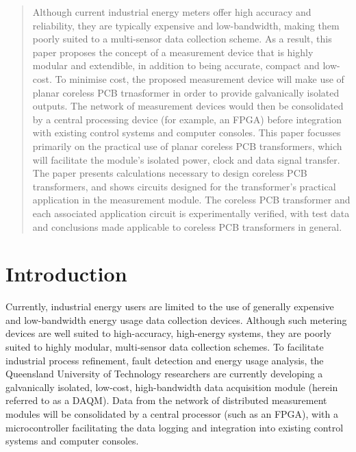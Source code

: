 \documentclass[conference]{IEEEtran}
\begin{document}
\begin{abstract}
Although current industrial energy meters offer high accuracy and reliability, they are typically expensive and low-bandwidth, making them poorly suited to a multi-sensor data collection scheme.  As a result, this paper proposes the concept of a measurement device that is highly modular and extendible, in addition to being accurate, compact and low-cost.  To minimise cost, the proposed measurement device will make use of planar coreless PCB trnasformer in order to provide galvanically isolated outputs.  The network of measurement devices would then be consolidated by a central processing device (for example, an FPGA) before integration with existing control systems and computer consoles.  
This paper focusses primarily on the practical use of planar coreless PCB transformers, which will facilitate the module's isolated power, clock and data signal transfer.  The paper presents calculations necessary to design coreless PCB transformers, and shows circuits designed for the transformer's practical application in the measurement module.  The coreless PCB transformer and each associated application circuit is experimentally verified, with test data and conclusions made applicable to coreless PCB transformers in general.
\end{abstract}


\IEEEpeerreviewmaketitle

\section{Introduction}
Currently, industrial energy users are limited to the use of generally expensive and low-bandwidth energy usage data collection devices. Although such metering devices are well suited to high-accuracy, high-energy systems, they are poorly suited to highly modular, multi-sensor data collection schemes.  To facilitate industrial process refinement, fault detection and energy usage analysis, the Queensland University of Technology researchers are currently developing a galvanically isolated, low-cost, high-bandwidth data acquisition module (herein referred to as a DAQM).  Data from the network of distributed measurement modules will be consolidated by a central processor (such as an FPGA), with a microcontroller facilitating the data logging and integration into existing control systems and computer consoles.
\end{document}
